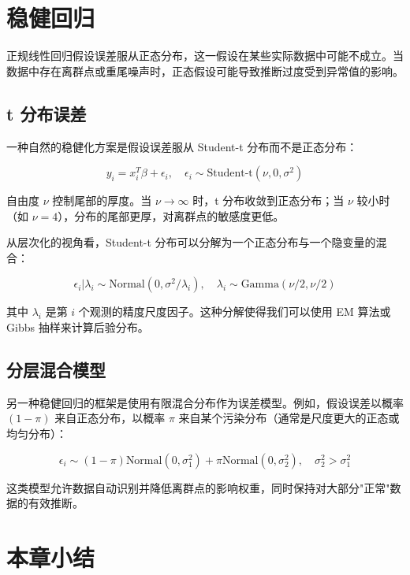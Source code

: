 \section{稳健回归}

正规线性回归假设误差服从正态分布，这一假设在某些实际数据中可能不成立。当数据中存在离群点或重尾噪声时，正态假设可能导致推断过度受到异常值的影响。

\subsection{t 分布误差}

一种自然的稳健化方案是假设误差服从 Student-t 分布而不是正态分布：

\begin{equation}
y_i = x_i^T\beta + \epsilon_i, \quad \epsilon_i \sim \text{Student-t}(\nu, 0, \sigma^2)
\label{eq:t-distribution-errors}
\end{equation}

自由度 $\nu$ 控制尾部的厚度。当 $\nu \to \infty$ 时，t 分布收敛到正态分布；当 $\nu$ 较小时（如 $\nu = 4$），分布的尾部更厚，对离群点的敏感度更低。

从层次化的视角看，Student-t 分布可以分解为一个正态分布与一个隐变量的混合：

\[
\epsilon_i | \lambda_i \sim \text{Normal}(0, \sigma^2/\lambda_i), \quad \lambda_i \sim \text{Gamma}(\nu/2, \nu/2)
\]

其中 $\lambda_i$ 是第 $i$ 个观测的精度尺度因子。这种分解使得我们可以使用 EM 算法或 Gibbs 抽样来计算后验分布。

\subsection{分层混合模型}

另一种稳健回归的框架是使用有限混合分布作为误差模型。例如，假设误差以概率 $(1-\pi)$ 来自正态分布，以概率 $\pi$ 来自某个污染分布（通常是尺度更大的正态或均匀分布）：

\begin{equation}
\epsilon_i \sim (1-\pi)\text{Normal}(0, \sigma_1^2) + \pi\text{Normal}(0, \sigma_2^2), \quad \sigma_2^2 > \sigma_1^2
\label{eq:mixture-robust}
\end{equation}

这类模型允许数据自动识别并降低离群点的影响权重，同时保持对大部分"正常"数据的有效推断。

\section{本章小结}

